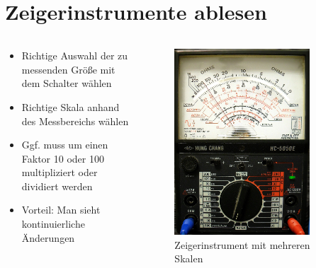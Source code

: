 
\section{Zeigerinstrumente ablesen}
\label{section:zeigerinstrumente_ablesen}
\begin{frame}%

\begin{columns}
    \begin{column}{0.48\textwidth}
    \begin{itemize}
  \item Richtige Auswahl der zu messenden Größe mit dem Schalter wählen
  \item Richtige Skala anhand des Messbereichs wählen
  \item Ggf. muss um einen Faktor 10 oder 100 multipliziert oder dividiert werden
  \item Vorteil: Man sieht kontinuierliche Änderungen
  \end{itemize}

    \end{column}
   \begin{column}{0.48\textwidth}
       
\begin{figure}
    \includegraphics[width=0.85\textwidth]{foto/197}
    \caption{\scriptsize Zeigerinstrument mit mehreren Skalen}
    \label{e_zeigerinstrument}
\end{figure}

   \end{column}
\end{columns}

\end{frame}

